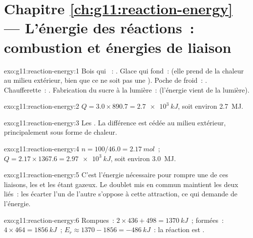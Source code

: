 \section*{Chapitre \ref{ch:g11:reaction-energy} --- L'énergie des réactions~: combustion et énergies de liaison}

\begin{solution}{exo:g11:reaction-energy:1}
Bois qui ~: . Glace qui fond~:  (elle
prend de la chaleur au milieu extérieur, bien que ce ne soit pas une
). Poche de froid~: . Chaufferette~:
. Fabrication du sucre à la lumière~: 
(l'énergie vient de la lumière).
\end{solution}

\begin{solution}{exo:g11:reaction-energy:2}
$Q = 3.0 \times 890.7 = \qty{2.7e3}{kJ}$, soit environ \qty{2.7}{MJ}.
\end{solution}

\begin{solution}{exo:g11:reaction-energy:3}
Les . La différence est cédée au milieu extérieur,
principalement sous forme de chaleur.
\end{solution}

\begin{solution}{exo:g11:reaction-energy:4}
$n = 100 / 46.0 = \qty{2.17}{mol}$~; $Q = 2.17 \times 1367.6 =
\qty{2.97e3}{kJ}$, soit environ \qty{3.0}{MJ}.
\end{solution}

\begin{solution}{exo:g11:reaction-energy:5}
C'est l'énergie nécessaire pour rompre une  de ces liaisons, les
 et les  étant gazeux. Le doublet mis en commun maintient
les deux  liés~: les écarter l'un de l'autre s'oppose à cette
attraction, ce qui demande de l'énergie.
\end{solution}

\begin{solution}{exo:g11:reaction-energy:6}
Rompues~: $2 \times 436 + 498 = \qty{1370}{kJ}$~; formées~:
$4 \times 464 = \qty{1856}{kJ}$~; $E_r \approx 1370 - 1856 =
\qty{-486}{kJ}$~: la réaction est .
\end{solution}

